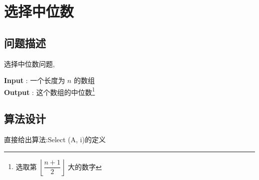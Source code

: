 \documentclass[a4paper, 10pt]{ctexart} %
\begin{document}
\newpage
\section{选择中位数} 
\subsection{问题描述}
选择中位数问题, 

\noindent \textbf{Input} : 一个长度为 $n$ 的数组\\
\textbf{Output} : 这个数组的中位数\footnote{
    选取第 $\left\lfloor \dfrac{n+1}{2} \right\rfloor$ 大的数字}
\subsection{算法设计}
直接给出算法:{\sffamily Select (A, i)}的定义
\end{document}
